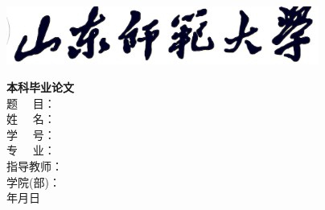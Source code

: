 \begin{titlepage}
	\vspace*{3mm}
	\begin{center}
		\includegraphics[width=0.77\textwidth,trim=8 0 0 0,clip]{data/resource/logo.jpg}
	\end{center}
	\vspace*{1cm}
	\fontsize{50pt}{24pt}
	\centering
	\textbf{本}\hfill\textbf{科}\hfill\textbf{毕}\hfill\textbf{业}\hfill\textbf{论}\hfill\textbf{文}
	\\
	\vspace*{7.7cm}
	题~ \quad ~目：\underline{\makebox[\nlength]{\sdnutitlechs}}\\\vspace*{1mm}
	姓~ \quad ~名：\underline{\makebox[\nlength]{\sdnuauthorchs}}\\\vspace*{1mm}
	学~ \quad ~号：\underline{\makebox[\nlength]{\sdnuauthorid}}\\\vspace*{1mm}
	专~ \quad ~业：\underline{\makebox[\nlength]{\sdnumajorchs}}\\\vspace*{1mm}
	指导教师：\underline{\makebox[\nlength]{\sdnumentorchs}}\\\vspace*{1mm}
	学院(部)：\underline{\makebox[\nlength]{\sdnucollegechs}}\\\vspace*{2.2cm}
	\sdnuyear 年\sdnumon 月\sdnuday 日
\end{titlepage}
